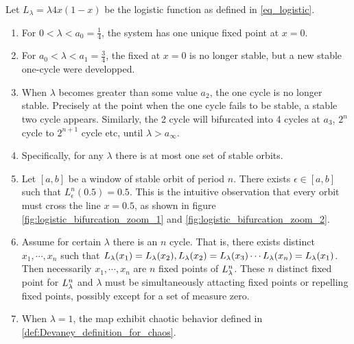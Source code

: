 \begin{observation}\label{th:logistic_bifurcation}
	Let $L_{\lambda} = \lambda 4x(1-x) $ be the logistic function as defined in \ref{eq_logistic}.

	\begin{enumerate}
		\item For $0 < \lambda < a_0 = \frac{1}{4}$, the system has one unique fixed point at $x = 0$. \label{log_fix_0}

		\item For $a_0 <\lambda < a_1 = \frac{3}{4}$, the fixed at $x=0$ is no longer stable, but a new stable one-cycle were developped. \label{log_fix_1}

		\item When $\lambda$ becomes greater than some value $a_2$, the one cycle is no longer stable. 
		Precisely at the point when the one cycle fails to be stable, a stable two cycle appears. 
		Similarly, the 2 cycle will bifurcated into 4 cycles at $a_3$, $2^n$ cycle to $2^{n+1}$ cycle etc, until $\lambda > a_{\infty}$. 
		\label{log_periodic_doubling}
		\item Specifically, for any $\lambda$ there is at most one set of stable orbits. \label{log_at_most_one_stable_orbit}

		\item Let $[a, b]$ be a window of stable orbit of period $n$.
		There exists $\epsilon \in [a, b]$ such that $L_{\epsilon}^n(0.5) = 0.5$. 
		This is the intuitive observation that every orbit must cross the line $x = 0.5$, as shown in figure \ref{fig:logistic_bifurcation_zoom_1} and \ref{fig:logistic_bifurcation_zoom_2}. \label{log_cross_half}

	\item \label{log_simul_stable_or_unstable}
		Assume for certain $\lambda$ there is an $n$ cycle. That is, there exists distinct $x_1, \cdots, x_n$ such that $L_{\lambda}(x_1) = L_{\lambda}(x_2), L_{\lambda}(x_2) = L_{\lambda}(x_3) \cdots L_{\lambda}(x_n) = L_{\lambda}(x_1)$.
		Then necessarily $x_1, \cdots, x_n$ are $n$ fixed points of $L_{\lambda}^n$. 
		These $n$ distinct fixed point for $L_{\lambda}^n$ and $\lambda$ must be simultaneously attacting fixed points or repelling fixed points, possibly except for a set of measure zero.

		\item  \label{log_chaos_at_1}
			When $\lambda = 1$, the map exhibit chaotic behavior defined in \ref{def:Devaney_definition_for_chaos}. 
	\end{enumerate}
\end{observation}

